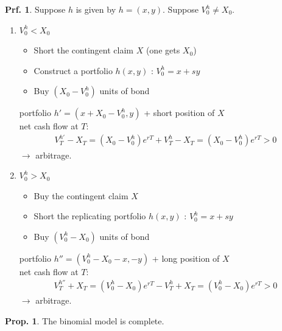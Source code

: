 \documentclass[a4paper,11pt]{jsarticle}
\theoremstyle{definition}
\newtheorem{prf}{Prf.}[subsection]
\newtheorem{prop}{Prop.}[subsection]
\begin{document}
\begin{prf}
  Suppose $h$ is given by $h=(x,y)$. Suppose $V_0^h\neq X_0$.
  \begin{enumerate}
    \item $V_0^h<X_0$
    \begin{itemize}
      \item Short the contingent claim $X$ (one gets $X_0$)
      \item Construct a portfolio $h(x,y)$ : $V_0^h=x+sy$
      \item Buy $(X_0-V_0^h)$ units of bond 
    \end{itemize}
    portfolio $h'=(x+X_0-V_0^h, y)$ + short position of $X$ \\
    net cash flow at $T$:
    \begin{align}
      V_T^{h'}-X_T=(X_0-V_0^h)e^{rT}+V_T^h -X_T
      =(X_0-V_0^h)e^{rT} > 0
    \end{align}  
    $\rightarrow$ arbitrage.
    \item $V_0^h>X_0$
    \begin{itemize}
      \item Buy the contingent claim $X$
      \item Short the replicating portfolio $h(x,y)$
      : $V_0^h=x+sy$
      \item Buy $(V_0^h-X_0)$ units of bond 
    \end{itemize}
    portfolio $h''=(V_0^h-X_0-x, -y)$ + long position of $X$ \\
    net cash flow at $T$:
    \begin{align}
      V_T^{h''}+X_T=(V_0^h-X_0)e^{rT}-V_T^h +X_T
      =(V_0^h-X_0)e^{rT} > 0
    \end{align}  
    $\rightarrow$ arbitrage.
  \end{enumerate}
\end{prf}


\begin{prop}
  The binomial model is complete.
\end{prop}
\end{document}
